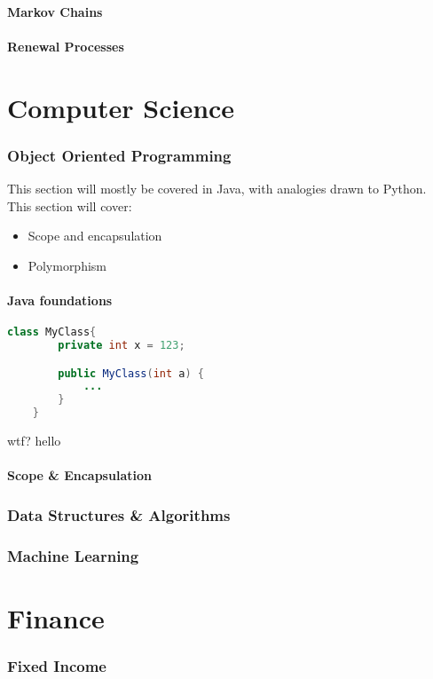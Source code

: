 \documentclass[10pt,a4paper,fleqn]{article} %
\begin{document}
\subsection{Markov Chains} %

\subsection{Renewal Processes} %

\newpage

\part{Computer Science}

\section{Object Oriented Programming} %
This section will mostly be covered in Java, with analogies drawn to Python. 
This section will cover:
\begin{itemize}
    \item Scope and encapsulation
    \item Polymorphism
\end{itemize}

\subsection{Java foundations} %

\begin{lstlisting}[language=Java,style=javac]
    class MyClass{
        private int x = 123;

        public MyClass(int a) {
            ...
        }
    }
\end{lstlisting}
wtf?
hello


\subsection{Scope \& Encapsulation} %


\section{Data Structures \& Algorithms} %

\section{Machine Learning} %

\newpage

\part {Finance}

\section{Fixed Income} %
\end{document}
